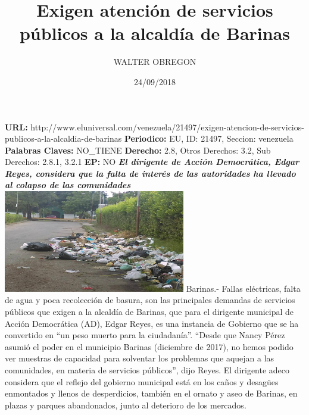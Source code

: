 \documentclass{article}%
\title{\textbf{Exigen atención de servicios públicos a la alcaldía de Barinas}}%
\author{WALTER OBREGON}%
\date{24/09/2018}%
\begin{document}
%
\normalsize%
\maketitle%
\textbf{URL: }%
http://www.eluniversal.com/venezuela/21497/exigen{-}atencion{-}de{-}servicios{-}publicos{-}a{-}la{-}alcaldia{-}de{-}barinas\newline%
%
\textbf{Periodico: }%
EU, %
ID: %
21497, %
Seccion: %
venezuela\newline%
%
\textbf{Palabras Claves: }%
NO\_TIENE\newline%
%
\textbf{Derecho: }%
2.8, %
Otros Derechos: %
3.2, %
Sub Derechos: %
2.8.1, 3.2.1\newline%
%
\textbf{EP: }%
NO\newline%
\newline%
%
\textbf{\textit{El dirigente de Acción Democrática,  Edgar Reyes, considera que la falta de interés de las autoridades ha llevado al colapso de las comunidades}}%
\newline%
\newline%
%
\includegraphics[width=300px]{196.jpg}%
\newline%
%
Barinas.{-} Fallas eléctricas, falta de agua y poca recolección de basura, son las principales demandas de servicios públicos que exigen a la alcaldía de Barinas, que para el dirigente municipal de Acción Democrática (AD), Edgar Reyes, es una instancia de Gobierno que se ha convertido en “un peso muerto para la ciudadanía”.%
\newline%
%
“Desde que Nancy Pérez asumió el poder en el municipio Barinas (diciembre de 2017), no hemos podido ver muestras de capacidad para solventar los problemas que aquejan a las comunidades, en materia de servicios públicos”, dijo Reyes.%
\newline%
%
El dirigente adeco considera que el reflejo del gobierno municipal está en los caños y desagües enmontados y llenos de desperdicios, también en el ornato y aseo de Barinas, en plazas y parques abandonados, junto al deterioro de los mercados.%
\newline%
\end{document}
